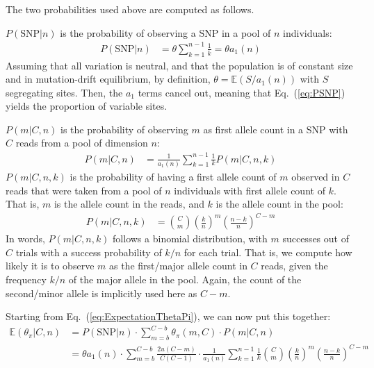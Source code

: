 \documentclass[a4paper,9pt,DIV=14]{scrartcl}
\newcommand\eqnref[1]{Eq.~(\ref{#1})}
\begin{document}
The two probabilities used above are computed as follows.

$P(\mbox{SNP} | n)$ is the probability of observing a SNP in a pool of $n$ individuals:
%
\begin{align}
\label{eq:PSNP}
P(\mbox{SNP} | n) &= \theta \sum_{k=1}^{n-1} \frac{1}{k} = \theta  a_1(n)
\end{align}
%
Assuming that all variation is neutral, and that the population is of constant size and in mutation-drift equilibrium, 
by definition, $\theta = \mathbb{E}( S / a_1(n) )$ with $S$ segregating sites.
Then, the $a_1$ terms cancel out, meaning that \eqnref{eq:PSNP} yields the proportion of variable sites.

$P(m|C, n)$ is the probability of observing $m$ as first allele count in a SNP with $C$ reads from a pool of dimension $n$:
%
\begin{align}
    \label{eq:Pmcn}
    P(m|C,n) 
    &= \frac{1}{a_1(n)}  \sum_{k=1}^{n-1} \frac{1}{k}  P(m|C,n,k)
\end{align}
%
$P(m|C, n, k)$ is the probability of having a first allele count of $m$ observed in $C$ reads that were taken
from a pool of $n$ individuals with first allele count of $k$.
That is, $m$ is the allele count in the reads, and $k$ is the allele count in the pool:
%
\begin{align}
    \label{eq:Pmcnk}
    P(m|C,n,k) &= {C \choose m} \left(\frac{k}{n}\right)^m \left(\frac{n-k}{n}\right)^{C-m}
\end{align}
%
In words, $P(m|C, n, k)$ follows a binomial distribution, with $m$ successes out of $C$ trials 
with a success probability of $k/n$ for each trial.
That is, we compute how likely it is to observe $m$ as the first/major allele count in $C$ reads, 
given the frequency $k/n$ of the major allele in the pool.
Again, the count of the second/minor allele is implicitly used here as $C-m$.

Starting from \eqnref{eq:ExpectationThetaPi}, we can now put this together:
%
\begin{align}
\nonumber
\mathbb{E}(\theta_\pi|C,n) &= P(\mbox{SNP} | n) \cdot \sum_{m=b}^{C-b} \theta_\pi(m,C) \cdot P(m|C,n)
\\
\label{eq:ExpThetaPiLong}
&= \theta  a_1(n) \cdot \sum_{m=b}^{C-b} \frac{2u(C-m)}{C(C-1)} \cdot \frac{1}{a_1(n)}  \sum_{k=1}^{n-1} \frac{1}{k}  {C \choose m} \left(\frac{k}{n}\right)^m \left(\frac{n-k}{n}\right)^{C-m}
\end{align}
\end{document}
